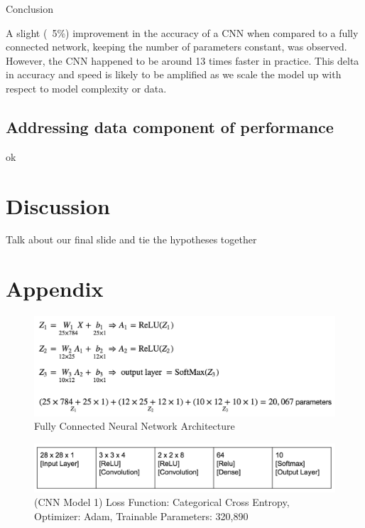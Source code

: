 \documentclass[12pt]{article}
\begin{document}
Conclusion

A slight (~5\%) improvement in the accuracy of a CNN when compared to a fully connected network, keeping the number of parameters constant, was observed. However, the CNN happened to be around 13 times faster in practice. This delta in accuracy and speed is likely to be amplified as we scale the model up with respect to model complexity or data.

\subsection{Addressing data component of performance}

ok

\section{Discussion}

Talk about our final slide and tie the hypotheses together




\section{Appendix}

\begin{figure}[h!]
  \begin{center}
    \includegraphics[scale=0.75]{fig2}
    \end{center}
  \caption{Fully Connected Neural Network Architecture}
  \label{fig:fcnn}
\end{figure}

\begin{figure}[h!]
  \begin{center}
    \includegraphics[scale=0.5]{fig3}
    \end{center}
  \caption{(CNN Model 1) Loss Function: Categorical Cross Entropy, Optimizer:
    Adam, Trainable Parameters: 320,890}
  \label{fig:cnnArch}
\end{figure}
\end{document}
